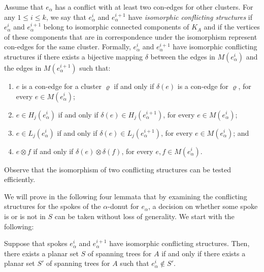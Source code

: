 \documentclass[letter,runningheads]{llncs}
\newcommand{\conf}{\otimes}
\begin{document}
Assume that $e_{\alpha}$ has a conflict with at least two con-edges for other clusters. For any $1\leq i \leq k$, we say that $e^i_{\alpha}$ and $e^{i+1}_{\alpha}$ have {\em isomorphic conflicting structures} if $e^i_{\alpha}$ and $e^{i+1}_{\alpha}$ belong to isomorphic connected components of $K_A$ and if the vertices of these components that are in correspondence under the isomorphism represent con-edges for the same cluster. Formally, $e^i_{\alpha}$ and $e^{i+1}_{\alpha}$ have isomorphic conflicting structures if there exists a bijective mapping $\delta$ between the edges in $M(e^i_{\alpha})$ and the edges in $M(e^{i+1}_{\alpha})$ such that:
\begin{enumerate}
\item $e$ is a con-edge for a cluster $\varrho$ if and only if $\delta(e)$ is a con-edge for $\varrho$, for every $e\in M(e^i_{\alpha})$;
\item $e\in H_j(e^i_{\alpha})$ if and only if $\delta(e)\in H_j(e^{i+1}_{\alpha})$, for every $e\in M(e^i_{\alpha})$;
\item $e\in L_j(e^i_{\alpha})$ if and only if $\delta(e)\in L_j(e^{i+1}_{\alpha})$, for every $e\in M(e^i_{\alpha})$; and
\item $e\conf f$ if and only if $\delta(e)\conf \delta(f)$, for every $e,f\in M(e^i_{\alpha})$.
\end{enumerate}

Observe that the isomorphism of two conflicting structures can be tested efficiently.


We will prove in the following four lemmata that by examining the conflicting structures for the spokes of the $\alpha$-donut for $e_{\alpha}$, a decision on whether some spoke is or is not in $S$ can be taken without loss of generality. We start with the following:

\begin{lemma}[{\sc Simplification 5}]\label{le:isomorphic}
Suppose that spokes $e^i_{\alpha}$ and $e^{i+1}_{\alpha}$ have isomorphic conflicting structures. Then, there exists a planar set $S$ of spanning trees for $A$ if and only if there exists a planar set $S'$ of spanning trees for $A$ such that $e^i_{\alpha}\notin S'$.
\end{lemma}
\end{document}
